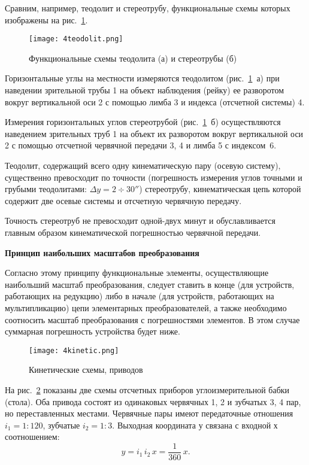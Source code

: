 Сравним, например, теодолит и стереотрубу, функциональные схемы которых изображены на рис.~\ref{pic:4teodolit}.

\begin{figure}[h!]
	\caption{Функциональные схемы теодолита (а) и стереотрубы (б)}
	\texttt{[image: 4teodolit.png]}
	\label{pic:4teodolit}
\end{figure}

Горизонтальные углы на местности измеряются теодолитом (рис.~\ref{pic:4teodolit}~а) при наведении зрительной трубы 1 на объект наблюдения (рейку) ее разворотом вокруг вертикальной оси 2 с помощью лимба 3 и индекса (отсчетной системы) 4. 

Измерения горизонтальных углов стереотрубой (рис.~\ref{pic:4teodolit}~б) осуществляются наведением зрительных труб 1 на объект их разворотом вокруг вертикальной оси 2 с помощью отсчетной червячной передачи 3, 4 и лимба 5 с индексом~6.

Теодолит, содержащий всего одну кинематическую пару (осевую систему), существенно превосходит по точности (погрешность измерения углов точными и грубыми теодолитами:  $ \Delta y=2\div30'' $) стереотрубу, кинематическая цепь которой содержит две осевые системы и отсчетную червячную передачу. 

Точность стереотруб не превосходит одной-двух минут и обуславливается главным образом кинематической погрешностью червячной передачи.

\begin{flushleft}
\textbf{Принцип наибольших масштабов преобразования}
\end{flushleft}

Согласно этому принципу функциональные элементы, осуществляющие наибольший масштаб преобразования, следует ставить в конце (для устройств, работающих на редукцию) либо в начале (для устройств, работающих на мультипликацию) цепи элементарных преобразователей, а также необходимо соотносить масштаб преобразования с погрешностями элементов. В этом случае суммарная погрешность устройства будет ниже.

\begin{figure}[H]
	\caption{Кинетические схемы, приводов}
	\texttt{[image: 4kinetic.png]}
	\label{pic:4kinetic}
\end{figure}

На рис.~\ref{pic:4kinetic} показаны две схемы отсчетных приборов углоизмерительной бабки (стола). Оба привода состоят из одинаковых червячных 1, 2 и зубчатых 3, 4 пар, но переставленных местами. Червячные пары имеют передаточные отношения $ i_1 = 1 : 120 $, зубчатые $ i_2 = 1 : 3 $. Выходная координата у связана с входной х соотношением:
\[
y = i_1 \, i_2 \, x = \dfrac{1}{360}\,x. 
 \]

